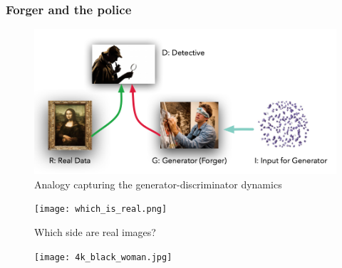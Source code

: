 \documentclass{Bredelebeamer}
\begin{document}
\begin{frame}
\frametitle{Forger and the police}
\begin{figure}[h!]
	\centering
	\includegraphics[width=\textwidth]{forger_police.png}
	\caption{Analogy capturing the generator-discriminator dynamics}
\end{figure}
\end{frame}


\begin{frame}
\begin{figure}[h!]
	\centering
	\texttt{[image: which\_is\_real.png]}
	\caption{Which side are real images?}
	\label{fig:which_is_real}
\end{figure}
\end{frame}

\begin{frame}
\begin{figure}[h!]
	\centering
	\texttt{[image: 4k\_black\_woman.jpg]}
\end{figure}
\end{frame}
\end{document}
